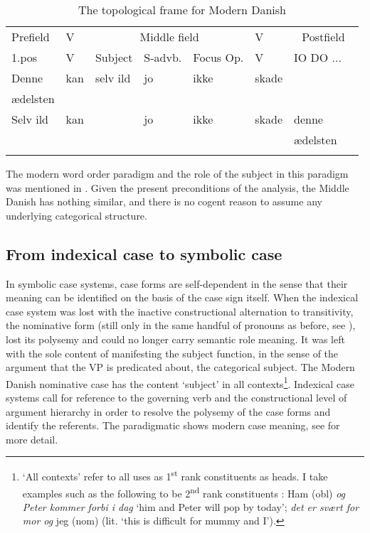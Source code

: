 \documentclass[output=paper]{langscibook}
\begin{document}
\begin{table}
    \caption{The topological frame for Modern Danish\label{tab:heltoft:10}}
    \begin{tabular}{llllllll}
        \lsptoprule
        {Prefield} & {V}  &  \multicolumn{3}{c}{Middle field}  & {V}  &  \multicolumn{2}{c}{Postfield}   \\\cmidrule(lr){3-5}\cmidrule(lr){7-8}
        {1.pos} & {V} & {Subject} & {S-advb.} & {Focus Op.} & {V} & {IO DO ...}\\\midrule
        Denne  &  kan & selv ild & jo  & ikke  &  skade  & \\
        \hspace{1ex} ædelsten & \\
        Selv ild   &   kan   & &     jo   &   ikke   &  skade  &  denne\\
                   &         & &          &          &         &  \hspace{1ex}ædelsten\\
        \lspbottomrule
    \end{tabular}
\end{table}


The modern word order paradigm and the role of the subject in this paradigm was mentioned in . Given the present preconditions of the analysis, the Middle Danish has nothing similar, and there is no cogent reason to assume any underlying categorical structure.

\subsection{From indexical case to symbolic case} \label{heltoft:5.2}

In symbolic case systems, case forms are self-dependent in the sense that their meaning can be identified on the basis of the case sign itself. When the indexical case system was lost with the inactive constructional alternation to transitivity, the nominative form (still only in the same handful of pronouns as before, see ), lost its polysemy and could no longer carry semantic role meaning. It was left with the sole content of manifesting the subject function, in the sense of the argument that the VP is predicated about, the categorical subject. The Modern Danish nominative case has the content ‘subject' in all contexts\footnote{‘All contexts' refer to all uses as 1\textsuperscript{st} rank constituents as heads. I take examples such as the following to be 2\textsuperscript{nd} rank constituents : Ham (obl) \textit{og Peter kommer forbi i dag} ‘him and Peter will pop by today'; \textit{det er svært for mor og} jeg (nom) (lit. ‘this is difficult for mummy and I').}. Indexical case systems call for reference to the governing verb and the constructional level of argument hierarchy in order to resolve the polysemy of the case forms and identify the referents. The paradigmatic  shows modern case meaning, see \citet{Heltoft2021b} for more detail.
\end{document}

